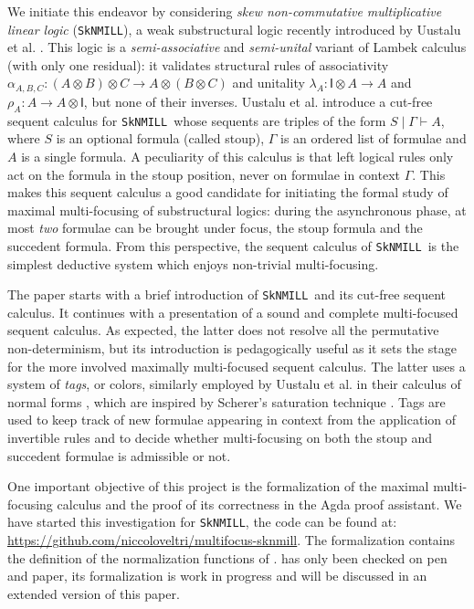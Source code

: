 \documentclass[runningheads]{llncs}
\newcommand{\ot}{\otimes}
\newcommand{\I}{\mathsf{I}}
\newcommand{\SkNMILL}{\texttt{SkNMILL}}
\begin{document}
We initiate this endeavor by considering \emph{skew non-commutative multiplicative linear logic} (\SkNMILL), a weak substructural logic recently introduced by Uustalu et al. \cite{UVW:protsn}. This logic is a \emph{semi-associative} and \emph{semi-unital} variant of Lambek calculus (with only one residual): it validates structural rules of associativity $\alpha_{A,B,C} : (A \ot B) \ot C \to A \ot (B \ot C)$ and unitality $\lambda_A : \I \ot A \to A$ and $\rho_A : A \to A \ot \I$, but none of their inverses. Uustalu et al. introduce a cut-free sequent calculus for \SkNMILL\ whose sequents are triples of the form $S \mid \Gamma \vdash A$, where $S$ is an optional formula (called stoup), $\Gamma$ is an ordered list of formulae and $A$ is a single formula. A peculiarity of this calculus is that left logical rules only act on the formula in the stoup position, never on formulae in context $\Gamma$. This makes this sequent calculus a good candidate for initiating the formal study of maximal multi-focusing of substructural logics: during the asynchronous phase, at most \emph{two} formulae can be brought under focus, the stoup formula and the succedent formula. From this perspective, the sequent calculus of \SkNMILL\ is the simplest deductive system which enjoys non-trivial multi-focusing.

The paper starts with a brief introduction of \SkNMILL\ and its cut-free sequent calculus. It continues with a presentation of a sound and complete multi-focused sequent calculus. As expected, the latter does not resolve all the permutative non-determinism, but its introduction is pedagogically useful as it sets the stage for the more involved maximally multi-focused sequent calculus. The latter uses a system of \emph{tags}, or colors, similarly employed by Uustalu et al. in their calculus of normal forms \cite{UVW:protsn}, which are inspired by Scherer's saturation technique \cite{scherer:simple:2015}.
Tags are used to keep track of new formulae appearing in context from the application of invertible rules and to decide whether multi-focusing on both the stoup and succedent formulae is admissible or not.

One important objective of this project is the formalization of the maximal multi-focusing calculus and the proof of its correctness in the Agda proof assistant. We have started this investigation for \SkNMILL, the code can be found at: \url{https://github.com/niccoloveltri/multifocus-sknmill}. The formalization contains the definition of the normalization functions of .  has only been checked on pen and paper, its formalization is work in progress and will be discussed in an extended version of this paper.
\end{document}
